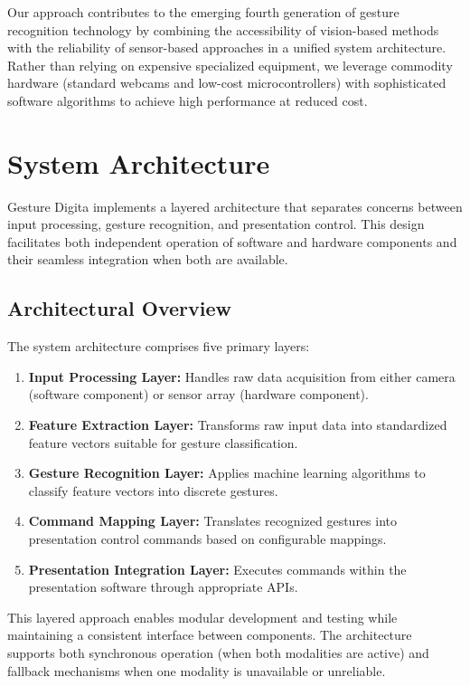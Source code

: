 \documentclass[arxiv,usenatbib]{iupartex}
\begin{document}
Our approach contributes to the emerging fourth generation of gesture recognition technology by combining the accessibility of vision-based methods with the reliability of sensor-based approaches in a unified system architecture. Rather than relying on expensive specialized equipment, we leverage commodity hardware (standard webcams and low-cost microcontrollers) with sophisticated software algorithms to achieve high performance at reduced cost.

\section{System Architecture}
Gesture Digita implements a layered architecture that separates concerns between input processing, gesture recognition, and presentation control. This design facilitates both independent operation of software and hardware components and their seamless integration when both are available.

\subsection{Architectural Overview}
The system architecture comprises five primary layers:

\begin{enumerate}
  \item \textbf{Input Processing Layer:} Handles raw data acquisition from either camera (software component) or sensor array (hardware component).
  
  \item \textbf{Feature Extraction Layer:} Transforms raw input data into standardized feature vectors suitable for gesture classification.
  
  \item \textbf{Gesture Recognition Layer:} Applies machine learning algorithms to classify feature vectors into discrete gestures.
  
  \item \textbf{Command Mapping Layer:} Translates recognized gestures into presentation control commands based on configurable mappings.
  
  \item \textbf{Presentation Integration Layer:} Executes commands within the presentation software through appropriate APIs.
\end{enumerate}

This layered approach enables modular development and testing while maintaining a consistent interface between components. The architecture supports both synchronous operation (when both modalities are active) and fallback mechanisms when one modality is unavailable or unreliable.
\end{document}

